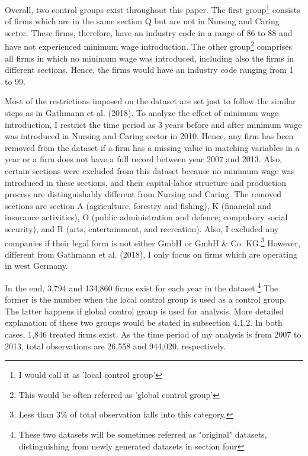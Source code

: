 \documentclass[11pt,a4paper,oneside]{article}
\begin{document}
\par 
Overall, two control groups exist throughout this paper. The first group\footnote{I would call it as 'local control group'} consists of firms which are in the same section Q but are not in Nursing and Caring sector. These firms, therefore, have an industry code in a range of 86 to 88 and have not experienced minimum wage introduction. The other group\footnote{This would be often referred as 'global control group'} comprises all firms in which no minimum wage was introduced, including also the firms in different sections. Hence, the firms would have an industry code ranging from 1 to 99.
\par
Most of the restrictions imposed on the dataset are set just to follow the similar steps as in Gathmann et al. (2018).\cite{Gathmann2018} To analyze the effect of minimum wage introduction, I restrict the time period as 3 years before and after minimum wage was introduced in Nursing and Caring sector in 2010. Hence, any firm has been removed from the dataset if a firm has a missing value in matching variables in a year or a firm does not have a full record between year 2007 and 2013. Also, certain sections were excluded from this dataset because no minimum wage was introduced in these sections, and their capital-labor structure and production process are distinguishably different from Nursing and Caring. The removed sections are section A (agriculture, forestry and fishing), K (financial and insurance activities), O (public administration and defence; compulsory social security), and R (arts, entertainment, and recreation). Also, I excluded any companies if their legal form is not either GmbH or GmbH \& Co. KG.\footnote{Less than 3\% of total observation falls into this category.} However, different from Gathmann et al. (2018)\cite{Gathmann2018}, I only focus on firms which are operating in west Germany. 
\par 
In the end, 3,794 and 134,860 firms exist for each year in the dataset.\footnote{These two datasets will be sometimes referred as "original" datasets, distinguishing from newly generated datasets in section four} The former is the number when the local control group is used as a control group. The latter happens if global control group is used for analysis. More detailed explanation of these two groups would be stated in subsection 4.1.2. In both cases, 1,846 treated firms exist. As the time period of my analysis is from 2007 to 2013, total observations are 26,558 and 944,020, respectively. 
\end{document}
